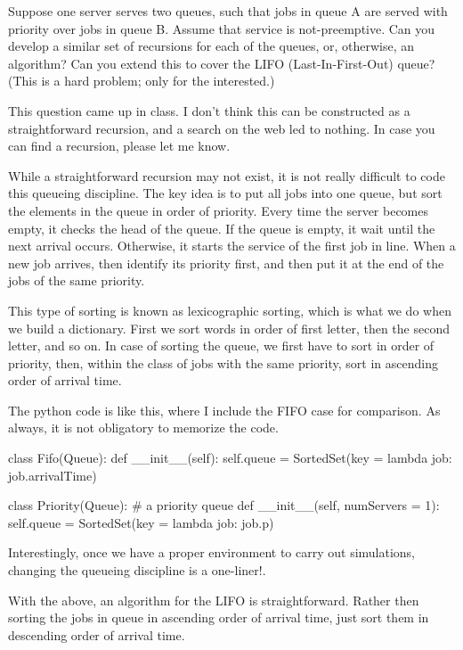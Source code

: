 \begin{exercise} Suppose one server serves two
  queues, such that jobs in queue A are served with priority over jobs
  in queue B. Assume that service is not-preemptive.  Can you develop
  a similar set of recursions for each of the queues, or, otherwise,
  an algorithm? Can you extend this to cover the LIFO (Last-In-First-Out) queue?
(This is  a hard problem; only for the interested.)
  \begin{solution}
    This question came up in class. I don't think this can be
    constructed as a straightforward recursion, and a search on the
    web led to nothing. In case you can find a recursion, please let
    me know.  

    While a straightforward recursion may not exist, it is not really
    difficult to code this queueing discipline. The key idea is to put
    all jobs into one queue, but sort the elements in the queue in
    order of priority. Every time the server becomes empty, it checks
    the head of the queue. If the queue is empty, it wait until the
    next arrival occurs. Otherwise, it starts the service of the first
    job in line. When a new job arrives, then identify its priority
    first, and then put it at the end of the jobs of the same
    priority.

    This type of sorting is known as lexicographic sorting, which is
    what we do when we build a dictionary. First we sort words in
    order of first letter, then the second letter, and so on. In case
    of sorting the queue, we first have to sort in order of priority,
    then, within the class of jobs with the same priority, sort in
    ascending order of arrival time.

    The python code is like this, where I include the FIFO case for
    comparison. As always, it is not obligatory to memorize the  code.

\begin{pyverbatim}
class Fifo(Queue):
    def __init__(self):
        self.queue = SortedSet(key = lambda job: job.arrivalTime)

class Priority(Queue): # a priority queue
    def __init__(self, numServers = 1):
        self.queue = SortedSet(key = lambda job: job.p)
\end{pyverbatim}

Interestingly, once we have a proper environment to carry out
simulations, changing the queueing discipline is a one-liner!.

With the above, an algorithm for the LIFO is
    straightforward. Rather then sorting the jobs in queue in
    ascending order of arrival time, just sort them in descending
    order of arrival time. 


\end{solution}
\end{exercise}
